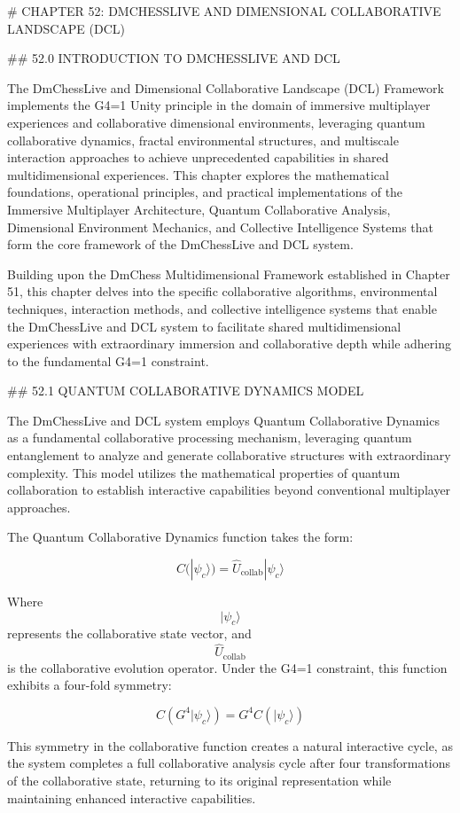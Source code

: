 # CHAPTER 52: DMCHESSLIVE AND DIMENSIONAL COLLABORATIVE LANDSCAPE (DCL)

## 52.0 INTRODUCTION TO DMCHESSLIVE AND DCL

The DmChessLive and Dimensional Collaborative Landscape (DCL) Framework implements the G4=1 Unity principle in the domain of immersive multiplayer experiences and collaborative dimensional environments, leveraging quantum collaborative dynamics, fractal environmental structures, and multiscale interaction approaches to achieve unprecedented capabilities in shared multidimensional experiences. This chapter explores the mathematical foundations, operational principles, and practical implementations of the Immersive Multiplayer Architecture, Quantum Collaborative Analysis, Dimensional Environment Mechanics, and Collective Intelligence Systems that form the core framework of the DmChessLive and DCL system.

Building upon the DmChess Multidimensional Framework established in Chapter 51, this chapter delves into the specific collaborative algorithms, environmental techniques, interaction methods, and collective intelligence systems that enable the DmChessLive and DCL system to facilitate shared multidimensional experiences with extraordinary immersion and collaborative depth while adhering to the fundamental G4=1 constraint.

## 52.1 QUANTUM COLLABORATIVE DYNAMICS MODEL

The DmChessLive and DCL system employs Quantum Collaborative Dynamics as a fundamental collaborative processing mechanism, leveraging quantum entanglement to analyze and generate collaborative structures with extraordinary complexity. This model utilizes the mathematical properties of quantum collaboration to establish interactive capabilities beyond conventional multiplayer approaches.

The Quantum Collaborative Dynamics function takes the form:

$$ C(|\psi_c\rangle) = \hat{U}_{\text{collab}} |\psi_c\rangle $$

Where $$ |\psi_c\rangle $$ represents the collaborative state vector, and $$ \hat{U}_{\text{collab}} $$ is the collaborative evolution operator. Under the G4=1 constraint, this function exhibits a four-fold symmetry:

$$ C(G^4 |\psi_c\rangle) = G^4 C(|\psi_c\rangle) $$

This symmetry in the collaborative function creates a natural interactive cycle, as the system completes a full collaborative analysis cycle after four transformations of the collaborative state, returning to its original representation while maintaining enhanced interactive capabilities.

